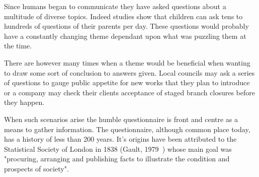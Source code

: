 






Since humans began to communicate they have asked questions about a multitude of diverse topics. Indeed studies show that children can ask tens to hundreds of questions of their parents per day. These questions would probably have a constantly changing theme dependant upon what was puzzling them at the time.

There are however many times when a theme would be beneficial when wanting to draw some sort of conclusion to answers given. Local councils may ask a series of questions to gauge public appetite for new works that they plan to introduce or a company may check their clients acceptance of staged branch closures before they happen.

When such scenarios arise the humble questionnaire is front and centre as a means to gather information. The questionnaire, although common place today, has a history of less than 200 years. It's origins have been attributed to the Statistical Society of London in 1838 (Gault, 1979~\cite{gault1907history}) whose main goal was "procuring, arranging and publishing facts to illustrate the condition and prospects of society".

